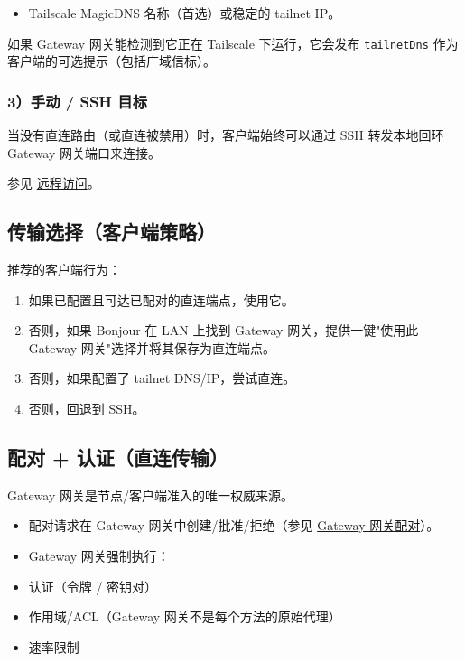 \begin{itemize}
  \item Tailscale MagicDNS 名称（首选）或稳定的 tailnet IP。
\end{itemize}


如果 Gateway 网关能检测到它正在 Tailscale 下运行，它会发布 \texttt{tailnetDns} 作为客户端的可选提示（包括广域信标）。

\subsubsection{3）手动 / SSH 目标}


当没有直连路由（或直连被禁用）时，客户端始终可以通过 SSH 转发本地回环 Gateway 网关端口来连接。

参见 \href{/gateway/remote}{远程访问}。

\subsection{传输选择（客户端策略）}


推荐的客户端行为：

\begin{enumerate}
  \item 如果已配置且可达已配对的直连端点，使用它。
  \item 否则，如果 Bonjour 在 LAN 上找到 Gateway 网关，提供一键"使用此 Gateway 网关"选择并将其保存为直连端点。
  \item 否则，如果配置了 tailnet DNS/IP，尝试直连。
  \item 否则，回退到 SSH。
\end{enumerate}


\subsection{配对 + 认证（直连传输）}


Gateway 网关是节点/客户端准入的唯一权威来源。

\begin{itemize}
  \item 配对请求在 Gateway 网关中创建/批准/拒绝（参见 \href{/gateway/pairing}{Gateway 网关配对}）。
  \item Gateway 网关强制执行：
  \item 认证（令牌 / 密钥对）
  \item 作用域/ACL（Gateway 网关不是每个方法的原始代理）
  \item 速率限制
\end{itemize}


